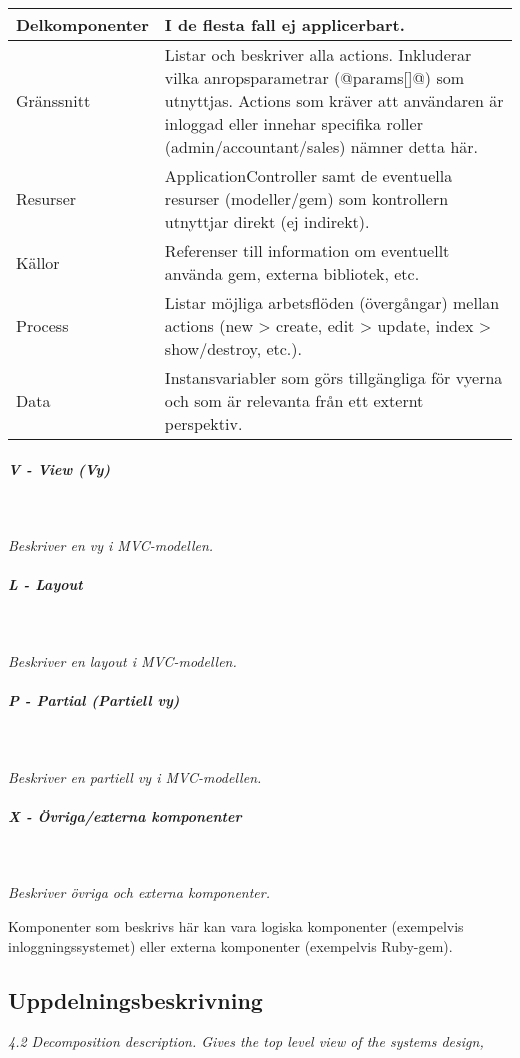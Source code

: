 \documentclass[a4paper, twoside, 11pt, titlepage]{article}
\begin{document}
				\begin {table} [ht] \begin{tabular} { p{2.6cm} p{12.5cm} }
					\hline
					Delkomponenter & I de flesta fall ej applicerbart.  \\
					\hline
					Gränssnitt & Listar och beskriver alla actions. Inkluderar vilka anropsparametrar (@params[]@) som utnyttjas. Actions som kräver att användaren är inloggad eller innehar specifika roller (admin/accountant/sales) nämner detta här.  \\
					\hline
					Resurser & ApplicationController samt de eventuella resurser (modeller/gem) som kontrollern utnyttjar direkt (ej indirekt).  \\
					\hline
					Källor & Referenser till information om eventuellt använda gem, externa bibliotek, etc.  \\
					\hline
					Process & Listar möjliga arbetsflöden (övergångar) mellan actions (new > create, edit > update, index > show/destroy, etc.).  \\
					\hline
					Data & Instansvariabler som görs tillgängliga för vyerna och som är relevanta från ett externt perspektiv.  \\
					\hline
				\end{tabular} \end{table} \FloatBarrier


			\subparagraph{\emph{V - View (\emph{Vy})}}\

				\emph{Beskriver en vy i MVC-modellen.}

			\subparagraph{\emph{L - Layout}}\

				\emph{Beskriver en layout i MVC-modellen.}

			\subparagraph{\emph{P - Partial (\emph{Partiell vy})}}\

				\emph{Beskriver en partiell vy i MVC-modellen.}

			\subparagraph{\emph{X - Övriga/externa komponenter}}\

				\emph{Beskriver övriga och externa komponenter.}

				Komponenter som beskrivs här kan vara logiska komponenter (exempelvis inloggningssystemet) eller externa komponenter (exempelvis Ruby-gem).

	\subsection{Uppdelningsbeskrivning}


	\emph{4.2 Decomposition description. Gives the top level view of the systems design,}
\end{document}
